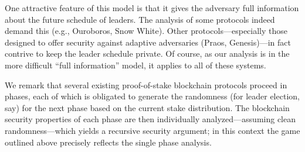  One attractive feature of this
model is that it gives the adversary full information about the future
schedule of leaders. The analysis of some protocols indeed demand this
(e.g., Ouroboros, Snow White). Other protocols---especially those
designed to offer security against adaptive adversaries (Praos,
Genesis)---in fact contrive to keep the leader schedule private. Of
course, as our analysis is in the more difficult ``full information''
model, it applies to all of these systems.

 We remark that
several existing proof-of-stake blockchain protocols proceed in
phases, each of which is obligated to generate the randomness (for
leader election, say) for the next phase based on the current stake
distribution. The blockchain security properties of each phase are
then individually analyzed---assuming clean randomness---which yields
a recursive security argument; in this context the game outlined above
precisely reflects the single phase analysis.

